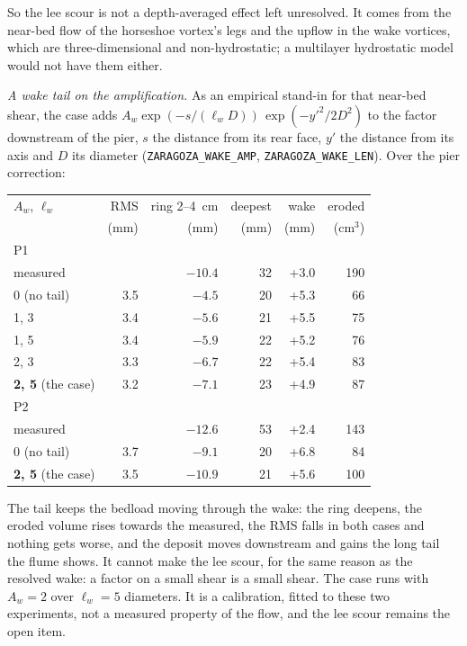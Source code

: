 So the lee scour is not a depth-averaged effect left unresolved. It comes
from the near-bed flow of the horseshoe vortex's legs and the upflow in the
wake vortices, which are three-dimensional and non-hydrostatic; a
multilayer hydrostatic model would not have them either.

\emph{A wake tail on the amplification.} As an empirical stand-in for that
near-bed shear, the case adds $A_w \exp(-s / (\ell_w D))\,
\exp(-y'^2 / 2D^2)$ to the factor downstream of the pier, $s$ the
distance from its rear face, $y'$ the distance from its axis and $D$ its
diameter (\texttt{ZARAGOZA\_WAKE\_AMP}, \texttt{ZARAGOZA\_WAKE\_LEN}).
Over the pier correction:

\begin{center}
\footnotesize
\setlength{\tabcolsep}{3pt}
\begin{tabular}{p{3.0cm}rrrrr}
\hline
$A_w$, $\ell_w$ & RMS & ring 2--4~cm & deepest & wake & eroded \\
 & (mm) & (mm) & (mm) & (mm) & (cm$^3$) \\
\hline
\multicolumn{6}{l}{P1} \\
measured & & $-10.4$ & 32 & +3.0 & 190 \\
0 (no tail) & 3.5 & $-4.5$ & 20 & +5.3 & 66 \\
1, 3 & 3.4 & $-5.6$ & 21 & +5.5 & 75 \\
1, 5 & 3.4 & $-5.9$ & 22 & +5.2 & 76 \\
2, 3 & 3.3 & $-6.7$ & 22 & +5.4 & 83 \\
\textbf{2, 5} (the case) & 3.2 & $-7.1$ & 23 & +4.9 & 87 \\
\multicolumn{6}{l}{P2} \\
measured & & $-12.6$ & 53 & +2.4 & 143 \\
0 (no tail) & 3.7 & $-9.1$ & 20 & +6.8 & 84 \\
\textbf{2, 5} (the case) & 3.5 & $-10.9$ & 21 & +5.6 & 100 \\
\hline
\end{tabular}
\end{center}

The tail keeps the bedload moving through the wake: the ring deepens, the
eroded volume rises towards the measured, the RMS falls in both cases and
nothing gets worse, and the deposit moves downstream and gains the long
tail the flume shows. It cannot make the lee scour, for the same reason as
the resolved wake: a factor on a small shear is a small shear. The case
runs with $A_w = 2$ over $\ell_w = 5$ diameters. It is a calibration,
fitted to these two experiments, not a measured property of the flow, and
the lee scour remains the open item.

